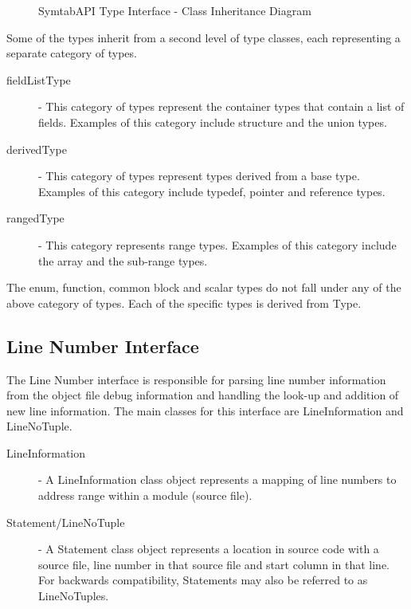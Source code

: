 \begin{figure}
     \caption{SymtabAPI Type Interface - Class Inheritance Diagram}
     \label{fig:class-inherit}
 \end{figure}

Some of the types inherit from a second level of type classes, each representing a separate category of types.
\begin{description}
\item[fieldListType] - This category of types represent the container types that contain a list of fields. Examples of this category include structure and the union types.
\item[derivedType] - This category of types represent types derived from a base type. Examples of this category include typedef, pointer and reference types.
\item[rangedType] - This category represents range types. Examples of this category include the array and the sub-range types.
\end{description}
The enum, function, common block and scalar types do not fall under any of the above category of types. Each of the specific types is derived from Type.

\subsection{Line Number Interface}

The Line Number interface is responsible for parsing line number information from the object file debug information and handling the look-up and addition of new line information. The main classes for this interface are LineInformation and LineNoTuple.

\begin{description}
\item[LineInformation] - A LineInformation class object represents a mapping of line numbers to address range within a module (source file).
\item[Statement/LineNoTuple] - A Statement class object represents a location in source code with a source file, line number in that source file and start column in that line. For backwards compatibility, Statements may also be referred to as LineNoTuples.
\end{description}

